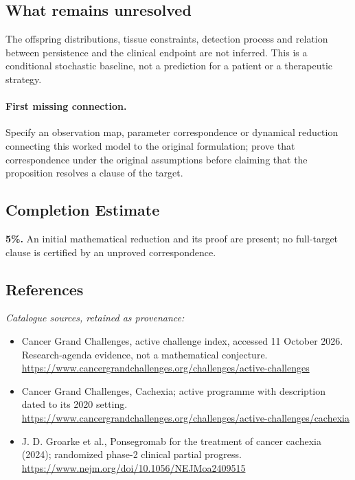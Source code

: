 \documentclass[11pt]{article}
\begin{document}
\subsection{What remains unresolved}
The offspring distributions, tissue constraints, detection process and relation between persistence and the clinical endpoint are not inferred. This is a conditional stochastic baseline, not a prediction for a patient or a therapeutic strategy.
\paragraph{First missing connection.} Specify an observation map, parameter correspondence or dynamical reduction connecting this worked model to the original formulation; prove that correspondence under the original assumptions before claiming that the proposition resolves a clause of the target.
\subsection{Completion Estimate}
\textbf{5\%.} An initial mathematical reduction and its proof are present; no full-target clause is certified by an unproved correspondence.
\subsection{References}
\noindent\emph{Catalogue sources, retained as provenance:}
\begin{itemize}
\item Cancer Grand Challenges, active challenge index, accessed 11 October 2026. Research-agenda evidence, not a mathematical conjecture. \url{https://www.cancergrandchallenges.org/challenges/active-challenges}
\item Cancer Grand Challenges, Cachexia; active programme with description dated to its 2020 setting. \url{https://www.cancergrandchallenges.org/challenges/active-challenges/cachexia}
\item J. D. Groarke et al., Ponsegromab for the treatment of cancer cachexia (2024); randomized phase-2 clinical partial progress. \url{https://www.nejm.org/doi/10.1056/NEJMoa2409515}
\end{itemize}
\end{document}
